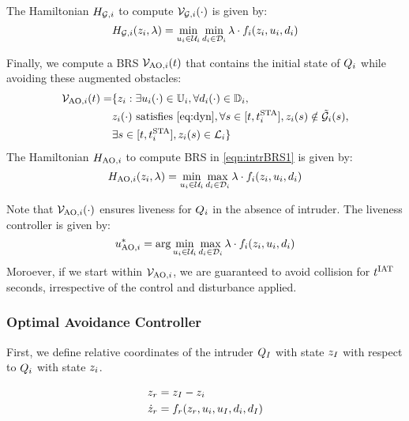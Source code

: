 The Hamiltonian $H_{\mathcal{G}, i}$ to compute $\mathcal{V}_{\mathcal{G}, i}(\cdot)$ is given by:
\begin{equation} \label{eqn:BRS_obsham}
\ham_{\mathcal{G}, i}(\state_i, \costate) = \min_{\ctrl_i \in \cset_i} \min_{\dstb_i \in \dset_i} \costate \cdot f_i (\state_i, \ctrl_i, \dstb_i)
\end{equation}

Finally, we compute a BRS $\mathcal{V}_{\text{AO}, i}(t)$ that contains the initial state of $Q_i$ while avoiding these augmented obstacles:
\begin{equation} \label{eqn:intrBRS1}
\begin{aligned}
\brs_{\text{AO}, i}(t) = & \{\state_i: \exists \ctrl_i(\cdot) \in \cfset_i, \forall \dstb_i(\cdot) \in \dfset_i, \\
& \state_i(\cdot) \text{ satisfies \eqref{eq:dyn}}, \forall s \in [t, \sta_i], \state_i(s) \notin \tilde\obsset_i(s), \\
& \exists s \in [t, \sta_i], \state_i(s) \in \targetset_i\}
\end{aligned}
\end{equation}
The Hamiltonian $H_{\text{AO}, i}$ to compute BRS in \eqref{eqn:intrBRS1} is given by:
\begin{equation*} \label{eqn:BRSham}
\ham_{\text{AO}, i}(\state_i, \costate) = \min_{\ctrl_i \in \cset_i} \max_{\dstb_i \in \dset_i} \costate \cdot f_i (\state_i, \ctrl_i, \dstb_i)
\end{equation*}

Note that $\mathcal{V}_{\text{AO}, i}(\cdot)$ ensures liveness for $Q_i$ in the absence of intruder. The liveness controller is given by:
\begin{equation}
u^*_{\text{AO}, i} = \arg \min_{u_i \in \mathcal{U}_i} \max_{d_i \in \mathcal{D}_i} \lambda \cdot f_i (z_i, u_i, d_i)
\end{equation}
Moroever, if we start within $\mathcal{V}_{\text{AO}, i}$, we are guaranteed to avoid collision for $t^\text{IAT}$ seconds, irrespective of the control and disturbance applied. 

\subsubsection{Optimal Avoidance Controller \label{sec:intruder_avoid}}
First, we define relative coordinates of the intruder $Q_{I}$ with state $z_I$ with respect to $Q_i$ with state $z_i$.

\begin{equation}
\label{eq:reldyn}
\begin{aligned}
\state_r &= \state_\intr - \state_i \\
\dot \state_r &= f_r(\state_r, \ctrl_i, \ctrl_\intr, \dstb_i, \dstb_\intr)
\end{aligned}
\end{equation}

